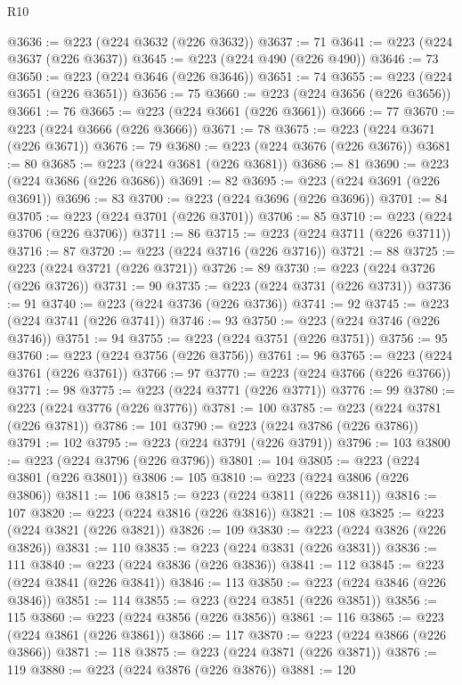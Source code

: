 \begin{lexlean}{R10}
\begin{coremodule}
@3636 := @223 (@224 @3632 (@226 @3632))
@3637 := 71
@3641 := @223 (@224 @3637 (@226 @3637))
@3645 := @223 (@224 @490 (@226 @490))
@3646 := 73
@3650 := @223 (@224 @3646 (@226 @3646))
@3651 := 74
@3655 := @223 (@224 @3651 (@226 @3651))
@3656 := 75
@3660 := @223 (@224 @3656 (@226 @3656))
@3661 := 76
@3665 := @223 (@224 @3661 (@226 @3661))
@3666 := 77
@3670 := @223 (@224 @3666 (@226 @3666))
@3671 := 78
@3675 := @223 (@224 @3671 (@226 @3671))
@3676 := 79
@3680 := @223 (@224 @3676 (@226 @3676))
@3681 := 80
@3685 := @223 (@224 @3681 (@226 @3681))
@3686 := 81
@3690 := @223 (@224 @3686 (@226 @3686))
@3691 := 82
@3695 := @223 (@224 @3691 (@226 @3691))
@3696 := 83
@3700 := @223 (@224 @3696 (@226 @3696))
@3701 := 84
@3705 := @223 (@224 @3701 (@226 @3701))
@3706 := 85
@3710 := @223 (@224 @3706 (@226 @3706))
@3711 := 86
@3715 := @223 (@224 @3711 (@226 @3711))
@3716 := 87
@3720 := @223 (@224 @3716 (@226 @3716))
@3721 := 88
@3725 := @223 (@224 @3721 (@226 @3721))
@3726 := 89
@3730 := @223 (@224 @3726 (@226 @3726))
@3731 := 90
@3735 := @223 (@224 @3731 (@226 @3731))
@3736 := 91
@3740 := @223 (@224 @3736 (@226 @3736))
@3741 := 92
@3745 := @223 (@224 @3741 (@226 @3741))
@3746 := 93
@3750 := @223 (@224 @3746 (@226 @3746))
@3751 := 94
@3755 := @223 (@224 @3751 (@226 @3751))
@3756 := 95
@3760 := @223 (@224 @3756 (@226 @3756))
@3761 := 96
@3765 := @223 (@224 @3761 (@226 @3761))
@3766 := 97
@3770 := @223 (@224 @3766 (@226 @3766))
@3771 := 98
@3775 := @223 (@224 @3771 (@226 @3771))
@3776 := 99
@3780 := @223 (@224 @3776 (@226 @3776))
@3781 := 100
@3785 := @223 (@224 @3781 (@226 @3781))
@3786 := 101
@3790 := @223 (@224 @3786 (@226 @3786))
@3791 := 102
@3795 := @223 (@224 @3791 (@226 @3791))
@3796 := 103
@3800 := @223 (@224 @3796 (@226 @3796))
@3801 := 104
@3805 := @223 (@224 @3801 (@226 @3801))
@3806 := 105
@3810 := @223 (@224 @3806 (@226 @3806))
@3811 := 106
@3815 := @223 (@224 @3811 (@226 @3811))
@3816 := 107
@3820 := @223 (@224 @3816 (@226 @3816))
@3821 := 108
@3825 := @223 (@224 @3821 (@226 @3821))
@3826 := 109
@3830 := @223 (@224 @3826 (@226 @3826))
@3831 := 110
@3835 := @223 (@224 @3831 (@226 @3831))
@3836 := 111
@3840 := @223 (@224 @3836 (@226 @3836))
@3841 := 112
@3845 := @223 (@224 @3841 (@226 @3841))
@3846 := 113
@3850 := @223 (@224 @3846 (@226 @3846))
@3851 := 114
@3855 := @223 (@224 @3851 (@226 @3851))
@3856 := 115
@3860 := @223 (@224 @3856 (@226 @3856))
@3861 := 116
@3865 := @223 (@224 @3861 (@226 @3861))
@3866 := 117
@3870 := @223 (@224 @3866 (@226 @3866))
@3871 := 118
@3875 := @223 (@224 @3871 (@226 @3871))
@3876 := 119
@3880 := @223 (@224 @3876 (@226 @3876))
@3881 := 120

\end{coremodule}
\end{lexlean}
